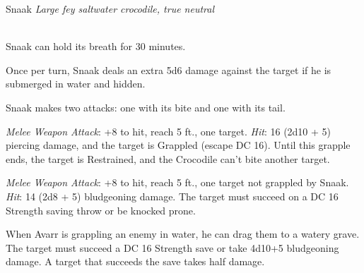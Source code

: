\documentclass[letterpaper,10pt,twoside,twocolumn,openany]{book}
\begin{document}
\begin{monsterbox}{Snaak}
	\textit{Large fey saltwater crocodile, true neutral}\\
	\hline%
	\basics[%
	armorclass = 14 (natural armor),
	hitpoints  = \dice{6d12 + 15},
	speed      = {25 ft, swim 40 ft}
	]
	\hline%
	\stats[
    STR = \stat{21}, %
    DEX = \stat{9},
    CON = \stat{17},
    INT = \stat{7},
    WIS = \stat{10},
    CHA = \stat{5}
	]
	\hline%
	\details[%
	skills = {Stealth +9 (when underwater)},
	senses = {pp 10},
	languages = {Crocodile, understands Common and Sylvan but cannot speak},
	challenge = 2
	]
	\hline \\[1mm]
	\begin{monsteraction}
		Snaak can hold its breath for 30 minutes.
	\end{monsteraction}
	
	\begin{monsteraction}[Ambush]
		Once per turn, Snaak deals an extra 5d6 damage against the target if he is submerged in water and hidden.
	\end{monsteraction}
	\begin{monsteraction}[Multiattack]
		Snaak makes two attacks: one with its bite and one with its tail.
	\end{monsteraction}
	
	\begin{monsteraction}[Bite]
		\emph{Melee Weapon Attack}: +8 to hit, reach 5 ft., one target. \emph{Hit}: 16 (2d10 + 5) piercing damage, and the target is Grappled (escape DC 16). Until this grapple ends, the target is Restrained, and the Crocodile can't bite another target.
	\end{monsteraction}

	\begin{monsteraction}[Tail]
		\emph{Melee Weapon Attack}: +8 to hit, reach 5 ft., one target not grappled by Snaak. \emph{Hit}: 14 (2d8 + 5) bludgeoning damage. The target must succeed on a DC 16 Strength saving throw or be knocked prone.
	\end{monsteraction}

	\begin{monsteraction}[Drown]
		When Avarr is grappling an enemy in water, he can drag them to a watery grave. 
		The target must succeed a DC 16 Strength save or take 4d10+5 bludgeoning damage. 
		A target that succeeds the save takes half damage.
	\end{monsteraction}
\end{monsterbox}
\end{document}
